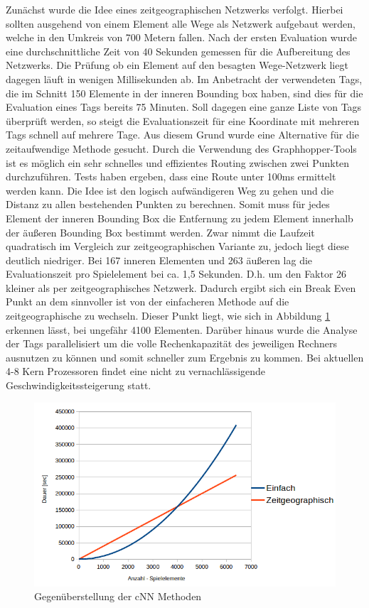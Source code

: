 Zunächst wurde die Idee eines zeitgeographischen Netzwerks verfolgt. Hierbei sollten ausgehend von einem Element alle Wege als Netzwerk aufgebaut werden, welche in den Umkreis von 700 Metern fallen. Nach der ersten Evaluation wurde eine durchschnittliche Zeit von 40 Sekunden gemessen für die Aufbereitung des Netzwerks. Die Prüfung ob ein Element auf den besagten Wege-Netzwerk liegt dagegen läuft in wenigen Millisekunden ab.
Im Anbetracht der verwendeten Tags, die im Schnitt 150 Elemente in der inneren Bounding box haben, sind dies für die Evaluation eines Tags bereits 75 Minuten.
Soll dagegen eine ganze Liste von Tags überprüft werden, so steigt die Evaluationszeit für eine Koordinate mit mehreren Tags schnell auf mehrere Tage.
Aus diesem Grund wurde eine Alternative für die zeitaufwendige Methode gesucht.
Durch die Verwendung des Graphhopper-Tools ist es möglich ein sehr schnelles und effizientes Routing zwischen zwei Punkten durchzuführen.
Tests haben ergeben, dass eine Route unter 100ms ermittelt werden kann. Die Idee ist den logisch aufwändigeren Weg zu gehen und die Distanz zu allen bestehenden Punkten zu berechnen. Somit muss für jedes Element der inneren Bounding Box die Entfernung zu jedem Element innerhalb der äußeren Bounding Box bestimmt werden. Zwar nimmt die Laufzeit quadratisch im Vergleich zur zeitgeographischen Variante zu, jedoch liegt diese deutlich niedriger. Bei 167 inneren Elementen und 263 äußeren lag die Evaluationszeit pro Spielelement bei ca. 1,5 Sekunden. D.h. um den Faktor 26 kleiner als per zeitgeographisches Netzwerk. Dadurch ergibt sich ein Break Even Punkt an dem sinnvoller ist von der einfacheren Methode auf die zeitgeographische zu wechseln.
Dieser Punkt liegt, wie sich in Abbildung \ref{img:ch6_img05_eval_match} erkennen lässt, bei ungefähr 4100 Elementen.
Darüber hinaus wurde die Analyse der Tags parallelisiert um die volle Rechenkapazität des jeweiligen Rechners ausnutzen zu können und somit schneller zum Ergebnis zu kommen. Bei aktuellen 4-8 Kern Prozessoren findet eine nicht zu vernachlässigende Geschwindigkeitssteigerung statt.

\begin{figure}[H]
\begin{center}
\includegraphics[width=150mm]{images/ch6_img05_eval_match.png}
\caption{Gegenüberstellung der cNN Methoden}
\label{img:ch6_img05_eval_match}
\end{center}
\end{figure}

